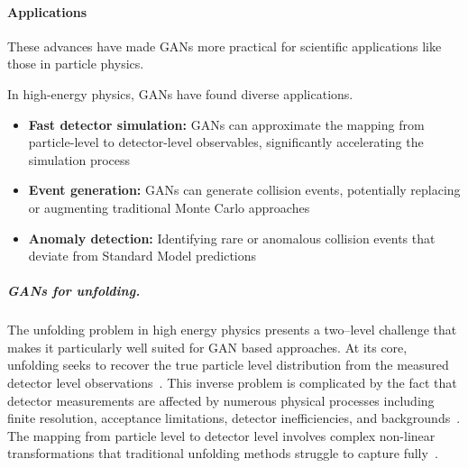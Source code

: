         \paragraph{Applications}
            These advances have made GANs more practical for scientific applications like those in particle physics.
        
            In high-energy physics, GANs have found diverse applications.
            \begin{itemize}
                \item \textbf{Fast detector simulation:} GANs can approximate the mapping from particle-level to detector-level observables, significantly accelerating the simulation process~\cite{maevskiy_generative_2023, rogachev_gan_2023, Paganini2018CaloGANNetworks, bandieramonte_fastcalogan_2023, giannelli_caloshowergan_2024, khattak_fast_2022}
                \item \textbf{Event generation:} GANs can generate collision events, potentially replacing or augmenting traditional Monte Carlo approaches~\cite{butter_how_2019, di_sipio_dijetgan_2019}
                \item \textbf{Anomaly detection:} Identifying rare or anomalous collision events that deviate from Standard Model predictions~\cite{vaslin_gan-ae_2023, DiMattia2019ADetection, Belis2024MachinePhysics, Knapp2021AdversariallyQuark}
            \end{itemize}

            \subparagraph{GANs for unfolding.}
                The unfolding problem in high energy physics presents a two--level challenge that makes it particularly well suited for GAN based approaches.
                At its core, unfolding seeks to recover the true particle level distribution from the measured detector level observations~\cite{noauthor_statistics_2010, FreiburgHEP, Segura2024APhysics, Berger2017LectureATLAS, blobel_unfolding_2002}. 
                This inverse problem is complicated by the fact that detector measurements are affected by numerous physical processes including finite resolution, acceptance limitations, detector inefficiencies, and backgrounds~\cite{agostini_bayesian_2003, schmitt_tunfold_2012}.
                The mapping from particle level to detector level involves complex non-linear transformations that traditional unfolding methods struggle to capture fully~\cite{hocker_svd_1996, adye_unfolding_2011}.
                
